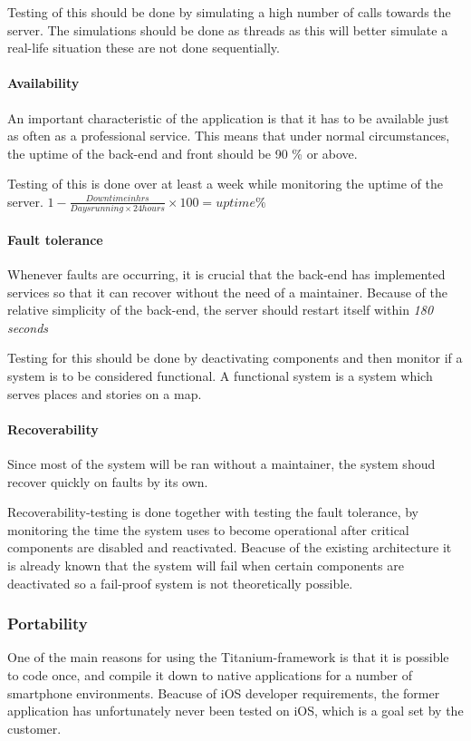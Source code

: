 Testing of this should be done by simulating a high number of calls towards the server. The simulations should be done as threads as this will better simulate a real-life situation these are not done sequentially.

\paragraph{Availability}
An important characteristic of the application is that it has to be available just as often as a professional service. This means that under normal circumstances, the uptime of the back-end and front should be 90 \% or above.

Testing of this is done over at least a week while monitoring the uptime of the server. $1-\frac{Downtime in hrs}{Days running \times 24 hours} \times 100 = uptime \% $

\paragraph{Fault tolerance}
Whenever faults are occurring, it is crucial that the back-end has implemented services so that it can recover without the need of a maintainer. Because of the relative simplicity of the back-end, the server should restart itself within \textit{180 seconds}

Testing for this should be done by deactivating components and then monitor if a system is to be considered functional. A functional system is a system which serves places and stories on a map.

\paragraph{Recoverability}
Since most of the system will be ran without a maintainer, the system shoud recover quickly on faults by its own.

Recoverability-testing is done together with testing the fault tolerance, by monitoring the time the system uses to become operational after critical components are disabled and reactivated. Beacuse of the existing architecture it is already known that the system will fail when certain components are deactivated so a fail-proof system is not theoretically possible.

\subsubsection{Portability}
One of the main reasons for using the Titanium-framework is that it is possible to code once, and compile it down to native applications for a number of smartphone environments. Beacuse of iOS developer requirements, the former application has unfortunately never been tested on iOS, which is a goal set by the customer.

